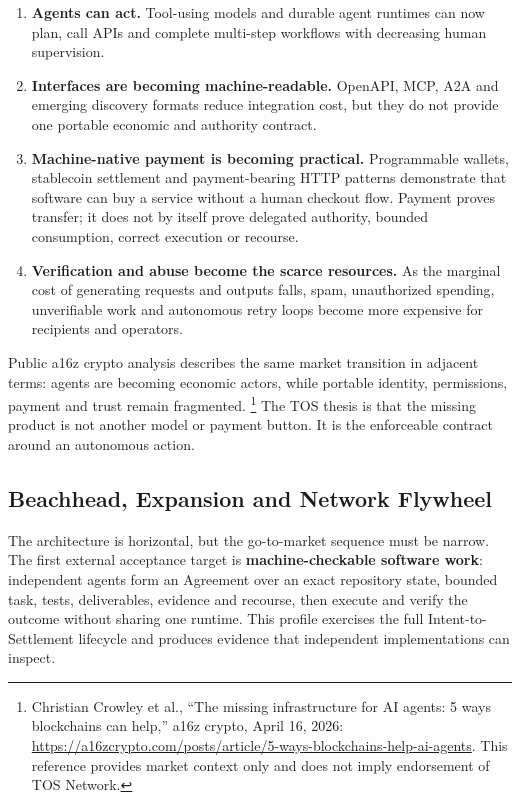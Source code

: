 \documentclass[11pt,oneside]{article}
\begin{document}
\begin{enumerate}
  \item \textbf{Agents can act.} Tool-using models and durable agent runtimes can now plan,
        call APIs and complete multi-step workflows with decreasing human supervision.
  \item \textbf{Interfaces are becoming machine-readable.} OpenAPI, MCP, A2A and emerging
        discovery formats reduce integration cost, but they do not provide one portable
        economic and authority contract.
  \item \textbf{Machine-native payment is becoming practical.} Programmable wallets,
        stablecoin settlement and payment-bearing HTTP patterns demonstrate that software can
        buy a service without a human checkout flow. Payment proves transfer; it does not by
        itself prove delegated authority, bounded consumption, correct execution or recourse.
  \item \textbf{Verification and abuse become the scarce resources.} As the marginal cost of
        generating requests and outputs falls, spam, unauthorized spending, unverifiable work
        and autonomous retry loops become more expensive for recipients and operators.
\end{enumerate}

Public a16z crypto analysis describes the same market transition in adjacent terms: agents
are becoming economic actors, while portable identity, permissions, payment and trust remain
fragmented.
\footnote{Christian Crowley et al., ``The missing infrastructure for AI agents: 5 ways
blockchains can help,'' a16z crypto, April 16, 2026:
\url{https://a16zcrypto.com/posts/article/5-ways-blockchains-help-ai-agents}. This reference
provides market context only and does not imply endorsement of TOS Network.}
The TOS thesis is that the missing product is not another model or payment button. It is the
enforceable contract around an autonomous action.

\subsection{Beachhead, Expansion and Network Flywheel}

The architecture is horizontal, but the go-to-market sequence must be narrow. The first
external acceptance target is \textbf{machine-checkable software work}: independent agents
form an Agreement over an exact repository state, bounded task, tests, deliverables, evidence
and recourse, then execute and verify the outcome without sharing one runtime. This profile
exercises the full Intent-to-Settlement lifecycle and produces evidence that independent
implementations can inspect.
\end{document}
